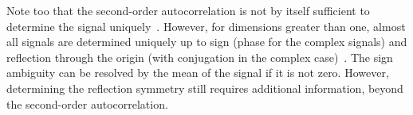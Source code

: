 \documentclass[english,11pt]{article}
\newcommand{\1}{\mathbf{1}}
\numberwithin{equation}{section}
\theoremstyle{plain}
\theoremstyle{definition}
\theoremstyle{remark}
\theoremstyle{plain}
\theoremstyle{remark}
\theoremstyle{plain}
\theoremstyle{plain}
\newcommand{\SNR}{\ensuremath{\textsf{SNR}}}
\begin{document}

Note too that the second-order autocorrelation is not by itself sufficient to determine the signal uniquely~\cite{beinert2015ambiguities,bendory2017fourier}.
However, for dimensions greater than one, almost all signals are determined uniquely up to sign (phase for the complex signals) and reflection through the origin (with conjugation in the complex case)~\cite{hayes1982reconstruction,hayes1982reducible}. The sign ambiguity can be resolved by the mean of the signal if it is not zero. However, determining the reflection symmetry still requires additional information, beyond the second-order autocorrelation.
\end{document}
